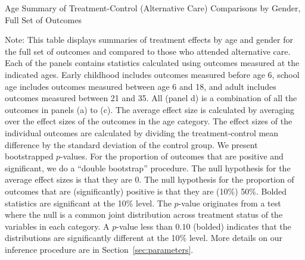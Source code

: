 \begin{table}[h!]
\centering
\begin{threeparttable}
\caption{Age Summary of Treatment-Control (Alternative Care) Comparisons by Gender, Full Set of Outcomes}\label{tab:rosenbaum-table-age-exp-TvCa-big}

\begin{tablenotes}
\item  \tiny Note:  This table displays summaries of treatment effects by age and gender for the full set of outcomes and compared to those who attended alternative care. Each of the panels contains statistics calculated using outcomes measured at the indicated ages. Early childhood includes outcomes measured before age 6, school age includes outcomes measured between age 6 and 18, and adult includes outcomes measured between 21 and 35. All (panel d) is a combination of all the outcomes in panels (a) to (c). The average effect size is calculated by averaging over the effect sizes of the outcomes in the age category. The effect sizes of the individual outcomes are calculated by dividing the treatment-control mean difference by the standard deviation of the control group. We present bootstrapped $p$-values. For the proportion of outcomes that are positive and significant, we do a ``double bootstrap'' procedure. The null hypothesis for the average effect sizes is that they are 0. The null hypothesis for the proportion of outcomes that are (significantly) positive is that they are (10\%) 50\%. Bolded statistics are significant at the 10\% level. The \citet{Rosenbaum_2005_Distribution_JRSS} $p$-value originates from a test where the null is a common joint distribution  across treatment status of the variables in each category. A $p$-value less than $0.10$ (bolded) indicates that the distributions are significantly different at the 10\% level. More details on our inference procedure are in Section~\ref{sec:parameters}.
\end{tablenotes}
\end{threeparttable}
\end{table}

